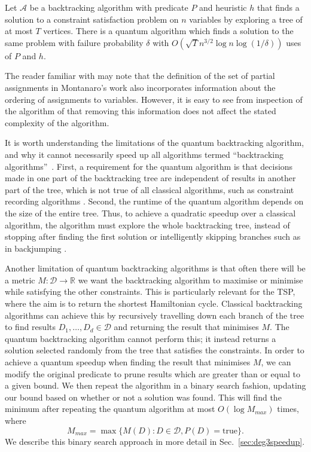 \begin{theorem}
\label{thm:backtrack}
Let $\mathcal{A}$ be a backtracking algorithm with predicate $P$ and heuristic $h$ that finds a solution to a constraint satisfaction problem on $n$ variables by exploring a tree of at most $T$ vertices. There is a quantum algorithm which finds a solution to the same problem with failure probability $\delta$ with $O(\sqrt{T}n^{3/2}\log n\log(1/\delta))$ uses of $P$ and $h$.
\end{theorem}

The reader familiar with \cite{montanaro2015} may note that the definition of the set of partial assignments in Montanaro's work also incorporates information about the ordering of assignments to variables. However, it is easy to see from inspection of the algorithm of \cite{montanaro2015} that removing this information does not affect the stated complexity of the algorithm.

It is worth understanding the limitations of the quantum backtracking algorithm, and why it cannot necessarily speed up all algorithms termed ``backtracking algorithms''~\cite{montanaro2015}. First, a requirement for the quantum algorithm is that decisions made in one part of the backtracking tree are independent of results in another part of the tree, which is not true of all classical algorithms, such as constraint recording algorithms \cite{dechter1990}. Second, the runtime of the quantum algorithm depends on the size of the entire tree. Thus, to achieve a quadratic speedup over a classical algorithm, the algorithm must explore the whole backtracking tree, instead of stopping after finding the first solution or intelligently skipping branches such as in backjumping \cite{dechter1990}.

Another limitation of quantum backtracking algorithms is that often there will be a metric $M \colon \mathcal{D} \rightarrow \mathbb{R}$ we want the backtracking algorithm to maximise or minimise while satisfying the other constraints. This is particularly relevant for the TSP, where the aim is to return the shortest Hamiltonian cycle. Classical backtracking algorithms can achieve this by recursively travelling down each branch of the tree to find results $D_1,\dots,D_d \in \mathcal{D}$ and returning the result that minimises $M$. The quantum backtracking algorithm cannot perform this; it instead returns a solution selected randomly from the tree that satisfies the constraints. In order to achieve a quantum speedup when finding the result that minimises $M$, we can modify the original predicate to prune results which are greater than or equal to a given bound. We then repeat the algorithm in a binary search fashion, updating our bound based on whether or not a solution was found. This will find the minimum after repeating the quantum algorithm at most $O(\log M_{max})$ times, where
%
\begin{equation}
M_{max} = \max\{M(D):D\in \mathcal{D}, P(D) = \text{true}\}.
\end{equation}
%
We describe this binary search approach in more detail in Sec.\ \ref{sec:deg3speedup}.

